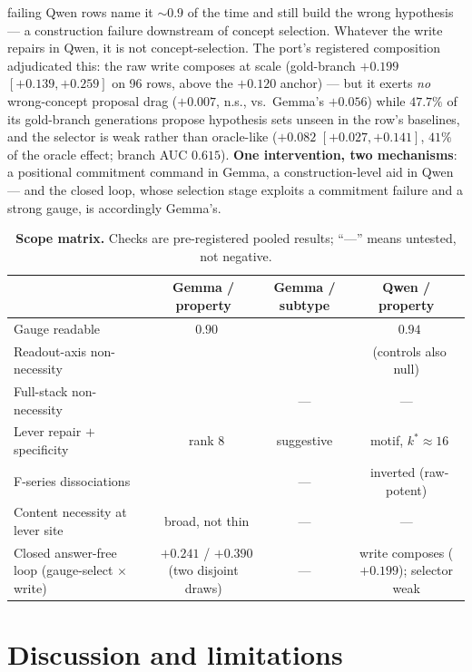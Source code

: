 \documentclass{article} %
\begin{document}
failing Qwen rows name it ${\sim}0.9$ of the time and still build
the wrong hypothesis --- a construction failure downstream of concept
selection. Whatever the write repairs in Qwen, it is not
concept-selection. The port's registered composition adjudicated
this: the raw write composes at scale (gold-branch $+0.199$
$[+0.139, +0.259]$ on 96 rows, above the $+0.120$ anchor) --- but it
exerts \emph{no} wrong-concept proposal drag ($+0.007$, n.s., vs.\
Gemma's $+0.056$) while $47.7\%$ of its gold-branch generations
propose hypothesis sets unseen in the row's baselines, and the
selector is weak rather than oracle-like ($+0.082$
$[+0.027, +0.141]$, $41\%$ of the oracle effect; branch AUC $0.615$).
\textbf{One intervention, two mechanisms}: a positional commitment
command in Gemma, a construction-level aid in Qwen --- and the closed
loop, whose selection stage exploits a commitment failure and a
strong gauge, is accordingly Gemma's.

\begin{table}[t]
\centering
\small
\begin{tabular}{lccc}
\toprule
& \textbf{Gemma / property} & \textbf{Gemma / subtype} & \textbf{Qwen / property} \\
\midrule
Gauge readable & \checkmark\ $0.90$ & \checkmark & \checkmark\ $0.94$ \\
Readout-axis non-necessity & \checkmark & \checkmark & \checkmark\ (controls also null) \\
Full-stack non-necessity & \checkmark & --- & --- \\
Lever repair $+$ specificity & \checkmark\ rank 8 & suggestive & \checkmark\ motif, $k^{*}{\approx}16$ \\
F-series dissociations & \checkmark & --- & \checkmark\ inverted (raw-potent) \\
Content necessity at lever site & \checkmark\ broad, not thin & --- & --- \\
Closed answer-free loop (gauge-select $\times$ write) & \checkmark\ $+0.241$ / $+0.390$ (two disjoint draws) & --- & write composes ($+0.199$); selector weak \\
\bottomrule
\end{tabular}
\caption{\textbf{Scope matrix.} Checks are pre-registered pooled
results; ``---'' means untested, not negative.}
\label{tab:scope}
\end{table}

\section{Discussion and limitations}\label{sec:discussion}
\end{document}
